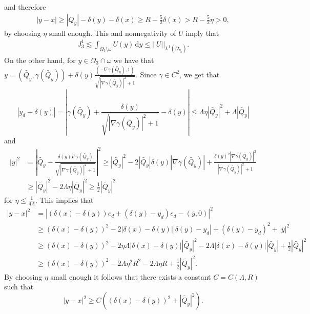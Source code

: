 \documentclass[a4paper,12pt,draft]{article}
\theoremstyle{plain}
\theoremstyle{definition}
\numberwithin{equation}{section}
\renewcommand{\leq}{\leqslant}
\renewcommand{\geq}{\geqslant}
\newcommand{\1}{1}
\newcommand{\dy} {\, \mathrm{d}y}
\begin{document}
and therefore 
\begin{align*}
|y-x|\geq |Q_y|-\delta(y)-\delta(x)\geq R-\frac 5 2 \delta(x)> R-\frac 5 2 \eta>0,
\end{align*}
by choosing $\eta$ small enough. This and nonnegativity of $U$ imply that
\begin{align}\label{eq:J31}
J_3^1\lesssim \int_{\Omega_3\setminus \omega} U(y)\dy\leq||U||_{L^1(\Omega_{\eta_0})}. 
\end{align}
On the other hand, for $y\in\Omega_3\cap\omega$ we have that $y=(\widetilde{Q_y},\gamma(\widetilde{Q_y}))+\delta(y)\frac{(-\nabla\gamma(\widetilde{Q_y}),1)}{\sqrt{|\nabla\gamma(\widetilde{Q_y})|^2+1}}$. Since $\gamma\in C^{2}$, we get that
\begin{equation*}
 |y_d-\delta(y)|=\left|\gamma(\widetilde{Q_y})+\frac{\delta(y)}{\sqrt{|\nabla\gamma(\widetilde{Q_y})|^2+1}}-\delta(y) \right|\leq \Lambda\eta|\widetilde{Q_y}|^2+\Lambda|\widetilde{Q_y}|
\end{equation*}
and 
\begin{align*}
 |\overline{y}|^2&=\left|\widetilde{Q_y}-\frac{\delta(y)\nabla\gamma(\widetilde{Q_y})}{\sqrt{|\nabla\gamma(\widetilde{Q_y})|^2+1}} \right|^2\geq \left|\widetilde{Q_y}\right|^2-2\left|\widetilde{Q_y}\right|\delta(y)|\nabla\gamma(\widetilde{Q_y})|+\frac{\delta(y)^2|\nabla\gamma(\widetilde{Q_y})|^2}{{|\nabla\gamma(\widetilde{Q_y})|^2+1}}\\
 &\geq \left|\widetilde{Q_y}\right|^2-2\Lambda\eta\left|\widetilde{Q_y}\right|^2\geq \tfrac 1 2|\widetilde{Q_y}|^2
\end{align*}
for $\eta\leq\frac{1}{4\Lambda}$. This implies that
\begin{align*}
 |y-x|^2&=|(\delta(x)-\delta(y))e_d+(\delta(y)-y_d)e_d-(\overline{y},0)|^2\\
 &\geq (\delta(x)-\delta(y))^2-2|\delta(x)-\delta(y)||\delta(y)-y_d|+(\delta(y)-y_d)^2+|\overline{y}|^2 \\
 &\geq  (\delta(x)-\delta(y))^2-2\eta\Lambda|\delta(x)-\delta(y)||\widetilde{Q_y}|^2-2\Lambda|\delta(x)-\delta(y)||\widetilde{Q_y}|+\tfrac 1 2|\widetilde{Q_y}|^2\\
 &\geq  (\delta(x)-\delta(y))^2-2\Lambda\eta^2R^2-2\Lambda\eta R+\tfrac 1 2|\widetilde{Q_y}|^2.
\end{align*}
By choosing $\eta$ small enough it follows that there exists a constant $C=C(\Lambda,R)$ such that
\begin{equation}\label{eq:Qy}
 |y-x|^2\geq C((\delta(x)-\delta(y))^2+|\widetilde{Q_y}|^2).
\end{equation}
\end{document}
